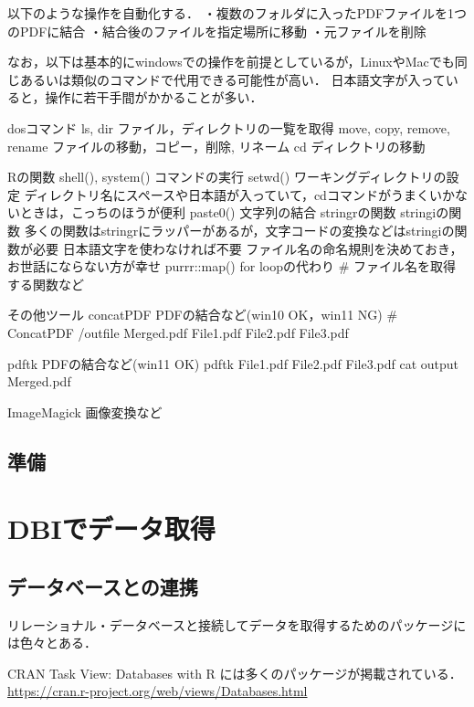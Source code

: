 \documentclass[
]{article}
\begin{document}
以下のような操作を自動化する．
・複数のフォルダに入ったPDFファイルを1つのPDFに結合
・結合後のファイルを指定場所に移動
・元ファイルを削除

なお，以下は基本的にwindowsでの操作を前提としているが，LinuxやMacでも同じあるいは類似のコマンドで代用できる可能性が高い．
日本語文字が入っていると，操作に若干手間がかかることが多い．

dosコマンド
ls, dir
ファイル，ディレクトリの一覧を取得
move, copy, remove, rename
ファイルの移動，コピー，削除, リネーム
cd
ディレクトリの移動

Rの関数
shell(), system()
コマンドの実行
setwd()
ワーキングディレクトリの設定
ディレクトリ名にスペースや日本語が入っていて，cdコマンドがうまくいかないときは，こっちのほうが便利
paste0()
文字列の結合
stringrの関数
stringiの関数
多くの関数はstringrにラッパーがあるが，文字コードの変換などはstringiの関数が必要
日本語文字を使わなければ不要
ファイル名の命名規則を決めておき，お世話にならない方が幸せ
purrr::map()
for loopの代わり
\# ファイル名を取得する関数など

その他ツール
concatPDF
PDFの結合など(win10 OK，win11 NG)
\# ConcatPDF /outfile Merged.pdf File1.pdf File2.pdf File3.pdf

pdftk
PDFの結合など(win11 OK)
pdftk File1.pdf File2.pdf File3.pdf cat output Merged.pdf

ImageMagick
画像変換など

\hypertarget{ux6e96ux5099-2}{%
\subsection{準備}\label{ux6e96ux5099-2}}

\hypertarget{dbi}{%
\section{DBIでデータ取得}\label{dbi}}

\hypertarget{ux30c7ux30fcux30bfux30d9ux30fcux30b9ux3068ux306eux9023ux643a}{%
\subsection{データベースとの連携}\label{ux30c7ux30fcux30bfux30d9ux30fcux30b9ux3068ux306eux9023ux643a}}

リレーショナル・データベースと接続してデータを取得するためのパッケージには色々とある．

CRAN Task View: Databases with R には多くのパッケージが掲載されている．
\url{https://cran.r-project.org/web/views/Databases.html}
\end{document}
